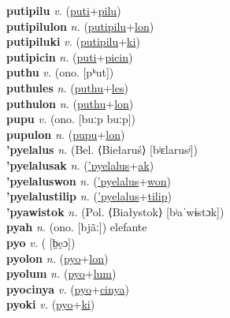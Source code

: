 \textbf{putipilu} \textit{v.} (\hyperref[puti]{puti}+\hyperref[pilu]{pilu})
 \label{putipilu} \\
\textbf{putipilulon} \textit{n.} (\hyperref[putipilu]{putipilu}+\hyperref[lon]{lon})
 \label{putipilulon} \\
\textbf{putipiluki} \textit{v.} (\hyperref[putipilu]{putipilu}+\hyperref[ki]{ki})
 \label{putipiluki} \\
\textbf{putipicin} \textit{n.} (\hyperref[puti]{puti}+\hyperref[picin]{picin})
 \label{putipicin} \\
\textbf{puthu} \textit{v.} (ono. [pʰut])
 \label{puthu} \\
\textbf{puthules} \textit{n.} (\hyperref[puthu]{puthu}+\hyperref[les]{les})
 \label{puthules} \\
\textbf{puthulon} \textit{n.} (\hyperref[puthu]{puthu}+\hyperref[lon]{lon})
 \label{puthulon} \\
\textbf{pupu} \textit{v.} (ono. [buːp buːp])
 \label{pupu} \\
\textbf{pupulon} \textit{n.} (\hyperref[pupu]{pupu}+\hyperref[lon]{lon})
 \label{pupulon} \\
\textbf{'pyelalus} \textit{n.} (Bel. ⟨Biełaruś⟩ [bʲɛlarusʲ])
 \label{'pyelalus} \\
\textbf{'pyelalusak} \textit{n.} (\hyperref['pyelalus]{'pyelalus}+\hyperref[ak]{ak})
 \label{'pyelalusak} \\
\textbf{'pyelaluswon} \textit{n.} (\hyperref['pyelalus]{'pyelalus}+\hyperref[won]{won})
 \label{'pyelaluswon} \\
\textbf{'pyelalustilip} \textit{n.} (\hyperref['pyelalus]{'pyelalus}+\hyperref[tilip]{tilip})
 \label{'pyelalustilip} \\
\textbf{'pyawistok} \textit{n.} (Pol. ⟨Białystok⟩ [bʲaˈwɨstɔk])
 \label{'pyawistok} \\
\textbf{pyah} \textit{n.} (ono. [bjãː])
elefante \label{pyah} \\
\textbf{pyo} \textit{v.} ( [b̤e̯ɔ])
 \label{pyo} \\
\textbf{pyolon} \textit{n.} (\hyperref[pyo]{pyo}+\hyperref[lon]{lon})
 \label{pyolon} \\
\textbf{pyolum} \textit{n.} (\hyperref[pyo]{pyo}+\hyperref[lum]{lum})
 \label{pyolum} \\
\textbf{pyocinya} \textit{v.} (\hyperref[pyo]{pyo}+\hyperref[cinya]{cinya})
 \label{pyocinya} \\
\textbf{pyoki} \textit{v.} (\hyperref[pyo]{pyo}+\hyperref[ki]{ki})
 \label{pyoki} \\
